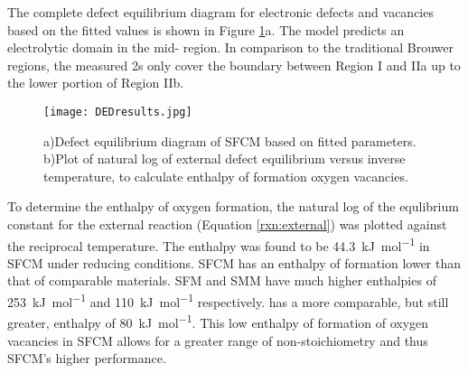     The complete defect equilibrium diagram for electronic defects and vacancies based on the fitted values is shown in Figure \ref{fig:ded}a.
    The model predicts an electrolytic domain in the mid- region.
    In comparison to the traditional Brouwer regions, the measured \po2s only cover the boundary between Region I and IIa up to the lower portion of Region IIb.

    \begin{figure}[p]
      \texttt{[image: DEDresults.jpg]}
      \caption{a)Defect equilibrium diagram of SFCM based on fitted parameters. b)Plot of natural log of external defect equilibrium versus inverse temperature, to calculate enthalpy of formation oxygen vacancies.}
      \label{fig:ded}
    \end{figure}

    To determine the enthalpy of oxygen formation, the natural log of the equlibrium constant for the external reaction (Equation \ref{rxn:external}) was plotted against the reciprocal temperature.
    The enthalpy was found to be \SI{44.3}{\kilo\joule\per\mol} in SFCM under reducing conditions.
    SFCM has an enthalpy of  formation lower than that of comparable materials.
    SFM and SMM have much higher enthalpies of \SI{253}{\kilo\joule\per\mol} and \SI{110}{\kilo\joule\per\mol} respectively.\cite{Kircheisen2012,Marrero-lopez2010}
     has a more comparable, but still greater, enthalpy of \SI{80}{\kilo\joule\per\mol}.\cite{Holt1999}
    This low enthalpy of formation of oxygen vacancies in SFCM allows for a greater range of non-stoichiometry and thus SFCM's higher performance.


